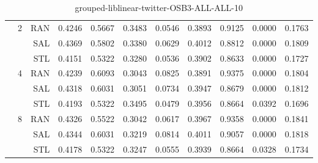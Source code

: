 \begin{center}
\begin{table}[htbp]
\begin{center}
\begin{tabular}{ | r | r | r | r | r | r | r | r | r | r | r |}
 & \multirow{3}{*}{2} & RAN & 0.4246 & 0.5667 & 0.3483 & 0.0546 & 0.3893 & 0.9125 & 0.0000 & 0.1763\\ \cline{3-11}
 &   & SAL & 0.4369 & 0.5802 & 0.3380 & 0.0629 & 0.4012 & 0.8812 & 0.0000 & 0.1809\\ \cline{3-11}
 &   & STL & 0.4151 & 0.5322 & 0.3280 & 0.0536 & 0.3902 & 0.8633 & 0.0000 & 0.1727\\ \cline{2-11}
 & \multirow{3}{*}{4} & RAN & 0.4239 & 0.6093 & 0.3043 & 0.0825 & 0.3891 & 0.9375 & 0.0000 & 0.1804\\ \cline{3-11}
 &   & SAL & 0.4318 & 0.6031 & 0.3051 & 0.0734 & 0.3947 & 0.8679 & 0.0000 & 0.1812\\ \cline{3-11}
 &   & STL & 0.4193 & 0.5322 & 0.3495 & 0.0479 & 0.3956 & 0.8664 & 0.0392 & 0.1696\\ \cline{2-11}
 & \multirow{3}{*}{8} & RAN & 0.4326 & 0.5522 & 0.3042 & 0.0617 & 0.3967 & 0.9358 & 0.0000 & 0.1841\\ \cline{3-11}
 &   & SAL & 0.4344 & 0.6031 & 0.3219 & 0.0814 & 0.4011 & 0.9057 & 0.0000 & 0.1818\\ \cline{3-11}
 &   & STL & 0.4178 & 0.5322 & 0.3247 & 0.0555 & 0.3939 & 0.8664 & 0.0328 & 0.1734\\ \cline{2-11}
\hline
\end{tabular}
\caption{grouped-liblinear-twitter-OSB3-ALL-ALL-10}
\end{center}
 \end{table}
\end{center}

